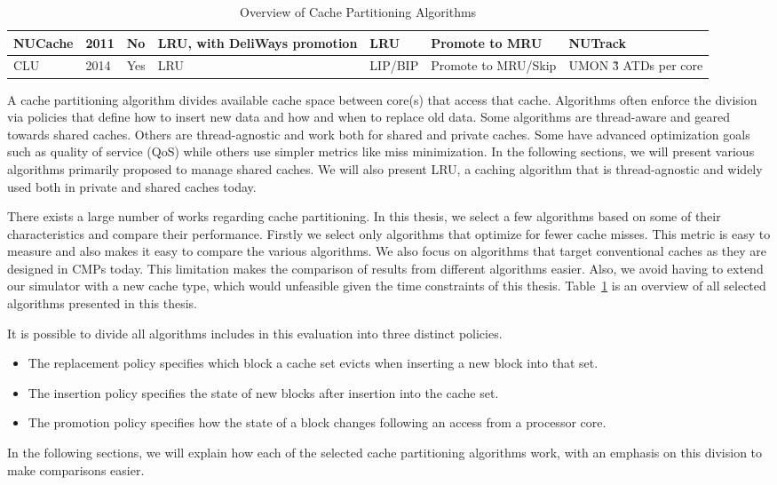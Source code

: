 \begin{table}[h]
\begin{tabular}{|l|l|l|l|l|l|l|}
NUCache                         & 2011                           & No                          & LRU, with DeliWays promotion     & LRU                            & Promote to MRU                 & NUTrack                               \\ \hline
CLU                             & 2014                           & Yes                         & LRU                              & LIP/BIP                        & Promote to MRU/Skip            & UMON \~3 ATDs per core                 \\ \hline
\end{tabular}
\label{tbl:algorithms}
\caption{Overview of Cache Partitioning Algorithms}
\end{table}

A cache partitioning algorithm divides available cache space between core(s) that access that cache.
Algorithms often enforce the division via policies that define how to insert new data and how and when to replace old data.
Some algorithms are thread-aware and geared towards shared caches.
Others are thread-agnostic and work both for shared and private caches.
Some have advanced optimization goals such as quality of service (QoS) while others use simpler metrics like miss minimization.
In the following sections, we will present various algorithms primarily proposed to manage shared caches.
We will also present LRU, a caching algorithm that is thread-agnostic and widely used both in private and shared caches today.

There exists a large number of works regarding cache partitioning. 
In this thesis, we select a few algorithms based on some of their characteristics and compare their performance.
Firstly we select only algorithms that optimize for fewer cache misses.
This metric is easy to measure and also makes it easy to compare the various algorithms.
We also focus on algorithms that target conventional caches as they are designed in CMPs today.
This limitation makes the comparison of results from different algorithms easier.
Also, we avoid having to extend our simulator with a new cache type, which would unfeasible given the time constraints of this thesis.
Table~\ref{tbl:algorithms} is an overview of all selected algorithms presented in this thesis.

It is possible to divide all algorithms includes in this evaluation into three distinct policies.
\begin{itemize}
\item The replacement policy specifies which block a cache set evicts when inserting a new block into that set.
\item The insertion policy specifies the state of new blocks after insertion into the cache set.
\item The promotion policy specifies how the state of a block changes following an access from a processor core.
\end{itemize}
In the following sections, we will explain how each of the selected cache partitioning algorithms work, with an emphasis on this division to make comparisons easier.










